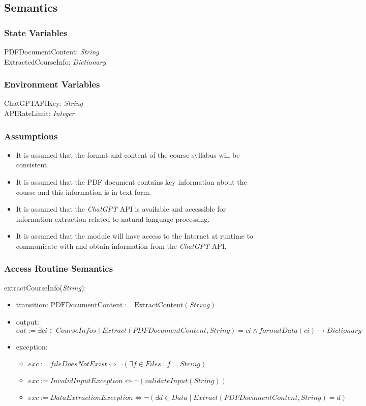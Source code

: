 \documentclass[12pt, titlepage]{article}
\begin{document}
\subsection{Semantics}

\subsubsection{State Variables}
PDFDocumentContent: \textit{String}\\
ExtractedCourseInfo: \textit{Dictionary}

\subsubsection{Environment Variables}
ChatGPTAPIKey: \textit{String}\\
APIRateLimit: \textit{Integer}

\subsubsection{Assumptions}

\begin{itemize}
  \item It is assumed that the format and content of the course syllabus will be consistent. 
  \item It is assumed that the PDF document contains key information about the course and this information is in text form.
  \item It is assumed that the \textit{ChatGPT} API is available and accessible for information extraction related to natural language processing.
  \item It is assumed that the module will have access to the Internet at runtime to communicate with and obtain information from the \textit{ChatGPT} API.
\end{itemize}

\subsubsection{Access Routine Semantics}

\noindent extractCourseInfo(\textit{String}):
\begin{itemize}
\item transition: \( \text{PDFDocumentContent} := \text{ExtractContent}(String) \)
\item output: $out := \mathit{\exists ci \in CourseInfos \mid Extract(PDFDocumentContent, String) = ci \land formatData(ci) \rightarrow Dictionary}$
\item exception: 
    \begin{itemize}
        \item $exc := \mathit{fileDoesNotExist} \iff \lnot (\exists f \in Files \mid f = String)$
        \item $exc := \mathit{InvalidInputException} \iff \lnot (validateInput(String))$
        \item $exc := \mathit{DataExtractionException} \iff \lnot (\exists d \in Data \mid Extract(PDFDocumentContent, String) = d)$
    \end{itemize}
\end{itemize}
\end{document}
